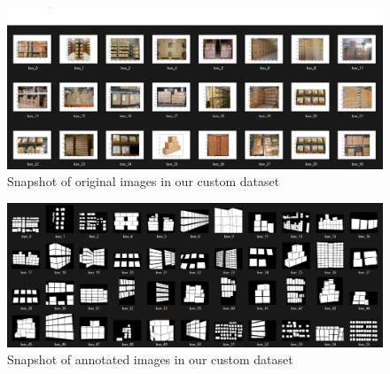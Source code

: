\begin{figure}[h]
      \centering
      \includegraphics[width=14cm]{assets/dataset/original_dataset.png}
      \caption{Snapshot of original images in our custom dataset}
\end{figure}

\begin{figure}[h]
      \centering
      \includegraphics[width=14cm]{assets/dataset/annotated_dataset.png}
      \caption{Snapshot of annotated images in our custom dataset}
\end{figure}